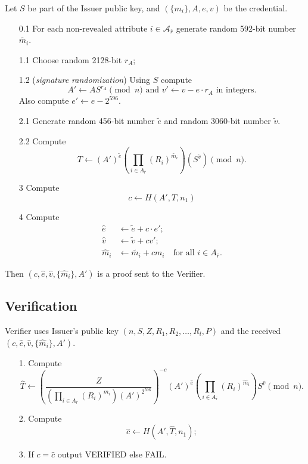\documentclass[a4paper]{article}
\begin{document}
Let $S$ be part of the Issuer public key, and $(\{m_i\},A,e,v)$ be the credential.  
\begin{enumerate}
\item [0.1] For each non-revealed attribute $i\in \mathcal{A}_{\overline{r}}$ generate random 592-bit number $\widetilde{m_i}$.
\item [1.1] Choose random 2128-bit $r_A$;
\item [1.2] (\emph{signature randomization}) Using $S$ compute 
\begin{equation}\label{eq:aprime}
A' \leftarrow A S^{r_A}\pmod{n}
\text{ and } v' \leftarrow v - e\cdot r_A\text{ in integers.}
\end{equation} 
Also compute $e' \leftarrow e - 2^{596}$.
\item[2.1] Generate random 456-bit number $\widetilde{e}$ and random 3060-bit number $\widetilde{v}$.
\item[2.2] Compute 
$$
T \leftarrow (A')^{\widetilde{e}}\left(\prod_{i\in A_{\overline{r}}} (R_i)^{\widetilde{m_i}}\right)(S^{\widetilde{v}})\pmod{n}.
$$
\item[3] Compute 
$$
c\leftarrow H(A',T,n_1)
$$
\item[4] Compute
\begin{align*}
\widehat{e}& \leftarrow \widetilde{e}+c\cdot e';\\
\widehat{v} &\leftarrow \widetilde{v}+cv';\\
\widehat{m}_i& \leftarrow \widetilde{m_i} + cm_i\quad \text{for all }i\in A_{\overline{r}}.
\end{align*}
\end{enumerate}
Then $(c,\widehat{e},\widehat{v},\{\widehat{m}_i\},A')$ is a proof sent to the Verifier.

\subsection{Verification}
Verifier uses Issuer's public key $(n, S,Z,R_1,R_2,\ldots,R_l,P)$ and the received $(c,\widehat{e},\widehat{v},\{\widehat{m}_i\},A')$.

\begin{enumerate}
\item[1.] Compute 
\begin{equation}\label{eq:that}
 \widehat{T} \leftarrow \left(
    \frac{Z}
    { \left(
        \prod_{i \in A_r}(R_i)^{m_i}
    \right)
    (A')^{2^{596}}
    }\right)^{-c}
    (A')^{\widehat{e}}
    \left(\prod_{i\in A_{\overline{r}}}(R_i)^{\widehat{m}_i}\right)
    S^{\widehat{v}}\pmod{n}.
\end{equation}
\item[2.] Compute $$
\widehat{c} \leftarrow H(A',\widehat{T},n_1);
$$
\item[3.] If $c=\widehat{c}$ output VERIFIED else FAIL.
\end{enumerate}
\end{document}
